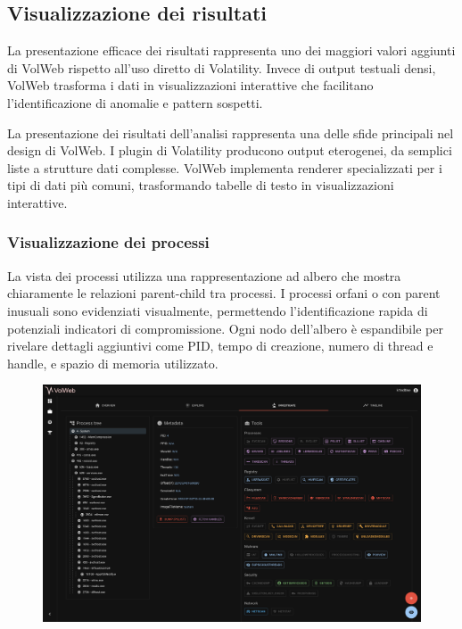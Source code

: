 \subsection{Visualizzazione dei risultati}

La presentazione efficace dei risultati rappresenta uno dei maggiori valori aggiunti di VolWeb rispetto all'uso diretto di Volatility. Invece di output testuali densi, VolWeb trasforma i dati in visualizzazioni interattive che facilitano l'identificazione di anomalie e pattern sospetti.

La presentazione dei risultati dell'analisi rappresenta una delle sfide principali nel design di VolWeb. I plugin di Volatility producono output eterogenei, da semplici liste a strutture dati complesse. VolWeb implementa renderer specializzati per i tipi di dati più comuni, trasformando tabelle di testo in visualizzazioni interattive.

\subsubsection{Visualizzazione dei processi}

La vista dei processi utilizza una rappresentazione ad albero che mostra chiaramente le relazioni parent-child tra processi. I processi orfani o con parent inusuali sono evidenziati visualmente, permettendo l'identificazione rapida di potenziali indicatori di compromissione. Ogni nodo dell'albero è espandibile per rivelare dettagli aggiuntivi come PID, tempo di creazione, numero di thread e handle, e spazio di memoria utilizzato.

\begin{figure}[H]
    \centering
    \includegraphics[width=1\linewidth]{images/volweb-original/volweb-process-tree.png}
\end{figure}

